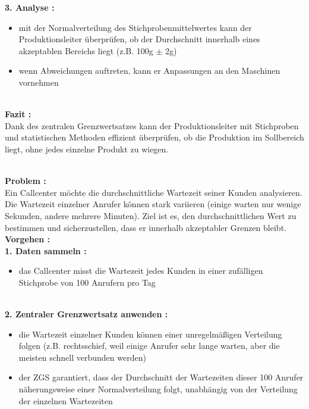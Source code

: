 \documentclass{article}
\begin{document}
\noindent\textbf{3. Analyse :}
\begin{itemize}
    \item mit der Normalverteilung des Stichprobenmittelwertes kann der Produktionsleiter überprüfen, ob der Durchschnitt innerhalb eines akzeptablen Bereichs liegt (z.B. 100g $\pm$ 2g)
    \item wenn Abweichungen auftreten, kann er Anpassungen an den Maschinen vornehmen
\end{itemize}
\\

\noindent\textbf{Fazit :}
\\ Dank des zentralen Grenzwertsatzes kann der Produktionsleiter mit Stichproben und statistischen Methoden effizient überprüfen, ob die Produktion im Sollbereich liegt, ohne jedes einzelne Produkt zu wiegen.

\newpage
{}
\\

\noindent\textbf{Problem :}
\\ Ein Callcenter möchte die durchschnittliche Wartezeit seiner Kunden analysieren. Die Wartezeit einzelner Anrufer können stark variieren (einige warten nur wenige Sekunden, andere mehrere Minuten). Ziel ist es, den durchschnittlichen Wert zu bestimmen und sicherzustellen, dass er innerhalb akzeptabler Grenzen bleibt.
\\

\noindent\textbf{Vorgehen :} 
\\

\noindent\textbf{1. Daten sammeln :}
\begin{itemize}
    \item das Callcenter misst die Wartezeit jedes Kunden in einer zufälligen Stichprobe von 100 Anrufern pro Tag
\end{itemize}
\\

\noindent\textbf{2. Zentraler Grenzwertsatz anwenden :}
\begin{itemize}
    \item die Wartezeit einzelner Kunden können einer unregelmäßigen Verteilung folgen (z.B. rechtsschief, weil einige Anrufer sehr lange warten, aber die meisten schnell verbunden werden)
    \item der ZGS garantiert, dass der Durchschnitt der Wartezeiten dieser 100 Anrufer näherungsweise einer Normalverteilung folgt, unabhängig von der Verteilung der einzelnen Wartezeiten
\end{itemize}
\\
\end{document}
